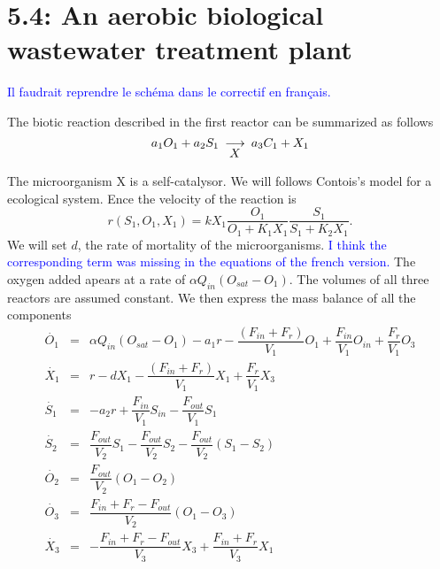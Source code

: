 \section*{5.4: An aerobic biological wastewater treatment plant}


\textcolor{blue}{Il faudrait reprendre le schéma dans le correctif en français.}

The biotic reaction described in the first reactor can be summarized as follows
$$a_{1}O_{1}+a_{2}S_{1} \cata{X} a_{3}C_{1}+X_{1}$$

The microorganism X is a self-catalysor. We will follows Contois's model for a ecological system. Ence the velocity of the reaction is 
$$r(S_{1},O_{1},X_{1})=kX_{1}\dfrac{O_{1}}{O_{1}+K_{1}X_{1}}\dfrac{S_{1}}{S_{1}+K_{2}X_{1}}.$$
We will set $d$, the rate of mortality of the microorganisms. \textcolor{blue}{I think the corresponding term was missing in the equations of the french version.} 
The oxygen added apears at a rate of $\alpha Q_{in}(O_{sat}-O_{1})$. The volumes of all three reactors are assumed constant. We then express the mass balance of all the components
$$\begin{array}{ccl}
\dot{O_{1}} & = & \alpha Q_{in}(O_{sat}-O_{1})-a_{1}r-\dfrac{(F_{in}+F_{r})}{V_{1}}O_{1}+\dfrac{F_{in}}{V_{1}}O_{in}+\dfrac{F_{r}}{V_{1}}O_{3}\\
\dot{X_{1}} & = & r -dX_{1}-\dfrac{(F_{in}+F_{r})}{V_{1}}X_{1}+\dfrac{F_{r}}{V_{1}}X_{3}\\
\dot{S_{1}} & = & -a_{2}r+\dfrac{F_{in}}{V_{1}}S_{in}-\dfrac{F_{out}}{V_{1}}S_{1}\\
\dot{S_{2}} & = & \dfrac{F_{out}}{V_{2}}S_{1}-\dfrac{F_{out}}{V_{2}}S_{2}-\dfrac{F_{out}}{V_{2}}(S_{1}-S_{2})\\
\dot{O_{2}} & = & \dfrac{F_{out}}{V_{2}}(O_{1}-O_{2})\\
\dot{O_{3}} & = & \dfrac{F_{in}+F_{r}-F_{out}}{V_{2}}(O_{1}-O_{3})\\
\dot{X_{3}} & = & -\dfrac{F_{in}+F_{r}-F_{out}}{V_{3}}X_{3}+\dfrac{F_{in}+F_{r}}{V_{3}}X_{1}
\end{array}$$



